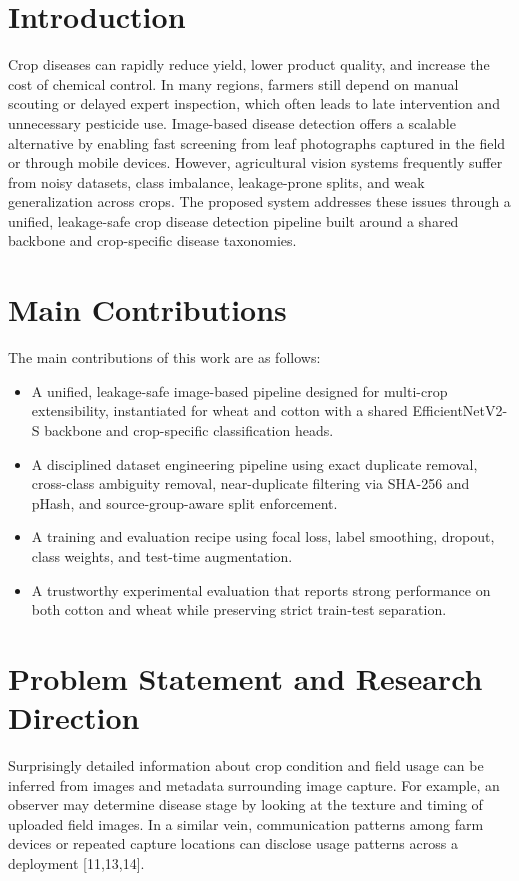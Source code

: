 \documentclass[12pt,a4paper]{report}
\begin{document}
\vspace{1cm}
 \section{Introduction}
Crop diseases can rapidly reduce yield, lower product quality, and increase the cost of chemical control. In many regions, farmers still depend on manual scouting or delayed expert inspection, which often leads to late intervention and unnecessary pesticide use. Image-based disease detection offers a scalable alternative by enabling fast screening from leaf photographs captured in the field or through mobile devices. However, agricultural vision systems frequently suffer from noisy datasets, class imbalance, leakage-prone splits, and weak generalization across crops. The proposed system addresses these issues through a unified, leakage-safe crop disease detection pipeline built around a shared backbone and crop-specific disease taxonomies.

  \section{Main Contributions}
The main contributions of this work are as follows:
\begin{itemize}
\item A unified, leakage-safe image-based pipeline designed for multi-crop extensibility, instantiated for wheat and cotton with a shared EfficientNetV2-S backbone and crop-specific classification heads.
\item A disciplined dataset engineering pipeline using exact duplicate removal, cross-class ambiguity removal, near-duplicate filtering via SHA-256 and pHash, and source-group-aware split enforcement.
\item A training and evaluation recipe using focal loss, label smoothing, dropout, class weights, and test-time augmentation.
\item A trustworthy experimental evaluation that reports strong performance on both cotton and wheat while preserving strict train-test separation.
\end{itemize}

\section{Problem Statement and Research Direction}
Surprisingly detailed information about crop condition and field usage can be inferred from images and metadata surrounding image capture. For example, an observer may determine disease stage by looking at the texture and timing of uploaded field images. In a similar vein, communication patterns among farm devices or repeated capture locations can disclose usage patterns across a deployment [11,13,14].
\end{document}
